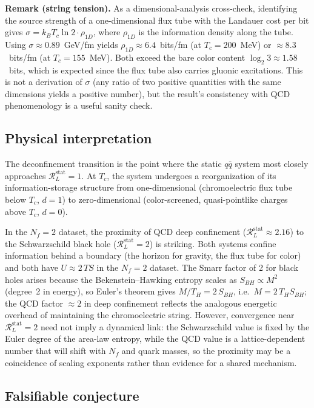 \documentclass[%
 aip,
 amsmath,amssymb,
 reprint,%
]{revtex4-2}
\newcommand{\RLs}{\mathcal{R}_L^{\mathrm{stat}}}
\begin{document}
\textbf{Remark (string tension).}
As a dimensional-analysis cross-check, identifying the source strength
of a one-dimensional flux tube with the Landauer cost per bit gives
$\sigma = k_B T_c \ln 2 \cdot \rho_{1D}$, where $\rho_{1D}$ is the
information density along the tube.  Using $\sigma \approx 0.89$~GeV/fm
yields $\rho_{1D} \approx 6.4$~bits/fm (at $T_c = 200$~MeV) or
$\approx 8.3$~bits/fm (at $T_c = 155$~MeV).  Both exceed the bare
color content $\log_2 3 \approx 1.58$~bits, which is expected since
the flux tube also carries gluonic excitations.  This is not a
derivation of $\sigma$ (any ratio of two positive quantities with
the same dimensions yields a positive number), but the result's
consistency with QCD phenomenology is a useful sanity check.

\subsection{Physical interpretation}

The deconfinement transition is the point where the static
$q\bar{q}$ system most closely approaches $\RLs = 1$.  At $T_c$,
the system undergoes a reorganization of its information-storage
structure from one-dimensional (chromoelectric flux tube below
$T_c$, $d=1$) to zero-dimensional (color-screened, quasi-pointlike
charges above $T_c$, $d=0$).

In the $N_f = 2$ dataset, the proximity of QCD deep confinement
($\RLs \approx 2.16$) to the Schwarzschild black hole
($\RLs = 2$) is striking.
Both systems confine information behind a boundary (the horizon for
gravity, the flux tube for color) and both have $U \approx 2\,TS$
in the $N_f = 2$ dataset.  The Smarr
factor of 2 for black holes arises because the Bekenstein--Hawking
entropy scales as $S_{BH} \propto M^2$ (degree~2 in energy), so
Euler's theorem gives $M/T_H = 2\,S_{BH}$, i.e.\ $M = 2\,T_H S_{BH}$;
the QCD factor
$\approx 2$ in deep confinement reflects the analogous energetic
overhead of maintaining the chromoelectric string.
However, convergence near $\RLs = 2$ need not imply a dynamical
link: the Schwarzschild value is fixed by the Euler degree of the
area-law entropy, while the QCD value is a lattice-dependent number
that will shift with $N_f$ and quark masses, so the proximity may be
a coincidence of scaling exponents rather than evidence for a shared
mechanism.

\subsection{Falsifiable conjecture}
\end{document}

